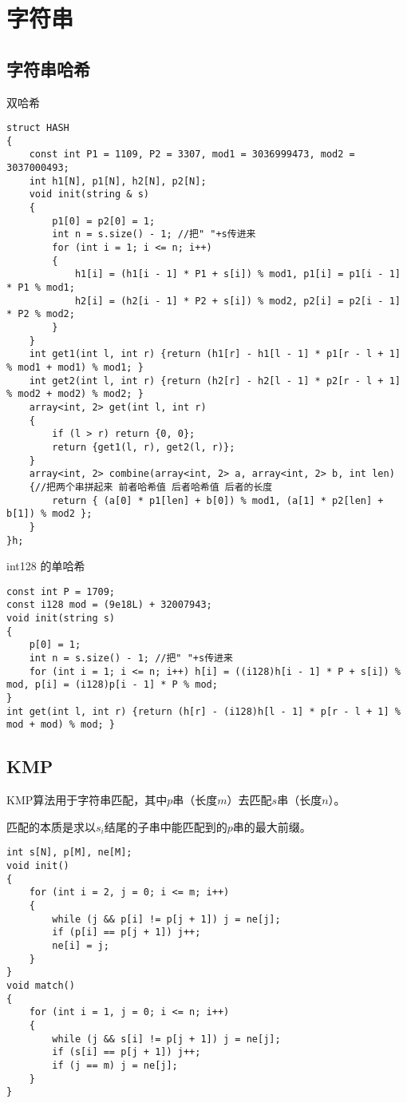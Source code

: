 \documentclass[a4paper, fontset=none]{ctexart}
\begin{document}
\section{字符串}
\subsection{字符串哈希}
双哈希
\begin{verbatim}
struct HASH
{
    const int P1 = 1109, P2 = 3307, mod1 = 3036999473, mod2 = 3037000493;
    int h1[N], p1[N], h2[N], p2[N];
    void init(string & s)
    {
        p1[0] = p2[0] = 1;
        int n = s.size() - 1; //把" "+s传进来
        for (int i = 1; i <= n; i++)
        {
            h1[i] = (h1[i - 1] * P1 + s[i]) % mod1, p1[i] = p1[i - 1] * P1 % mod1;
            h2[i] = (h2[i - 1] * P2 + s[i]) % mod2, p2[i] = p2[i - 1] * P2 % mod2;
        }
    }
    int get1(int l, int r) {return (h1[r] - h1[l - 1] * p1[r - l + 1] % mod1 + mod1) % mod1; }
    int get2(int l, int r) {return (h2[r] - h2[l - 1] * p2[r - l + 1] % mod2 + mod2) % mod2; }
    array<int, 2> get(int l, int r)
    {
        if (l > r) return {0, 0};
        return {get1(l, r), get2(l, r)};
    }
    array<int, 2> combine(array<int, 2> a, array<int, 2> b, int len)
    {//把两个串拼起来 前者哈希值 后者哈希值 后者的长度
        return { (a[0] * p1[len] + b[0]) % mod1, (a[1] * p2[len] + b[1]) % mod2 };
    }
}h;
\end{verbatim}

int128 的单哈希

\begin{verbatim}
const int P = 1709;
const i128 mod = (9e18L) + 32007943;
void init(string s)
{
    p[0] = 1;
    int n = s.size() - 1; //把" "+s传进来
    for (int i = 1; i <= n; i++) h[i] = ((i128)h[i - 1] * P + s[i]) % mod, p[i] = (i128)p[i - 1] * P % mod;
}
int get(int l, int r) {return (h[r] - (i128)h[l - 1] * p[r - l + 1] % mod + mod) % mod; }
\end{verbatim}
\subsection{KMP}

KMP算法用于字符串匹配，其中$p$串（长度$m$）去匹配$s$串（长度$n$）。

匹配的本质是求以$s_i$结尾的子串中能匹配到的$p$串的最大前缀。

\begin{verbatim}
int s[N], p[M], ne[M];
void init()
{
    for (int i = 2, j = 0; i <= m; i++)
    {
        while (j && p[i] != p[j + 1]) j = ne[j];
        if (p[i] == p[j + 1]) j++;
        ne[i] = j;
    }
}
void match()
{
    for (int i = 1, j = 0; i <= n; i++)
    {
        while (j && s[i] != p[j + 1]) j = ne[j];
        if (s[i] == p[j + 1]) j++;
        if (j == m) j = ne[j];
    }
}
\end{verbatim}
\end{document}
